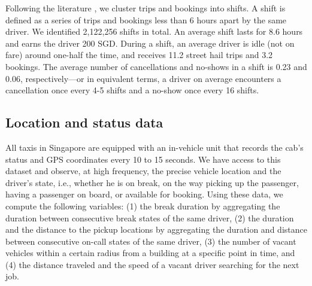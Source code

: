 \documentclass[reviewmode,AEJ]{AEA}
\begin{document}
Following the literature \citep{farber2015you,agarwal2015singaporean}%
, we cluster trips and bookings into shifts. A shift is defined as a series of trips and bookings less than 6 
hours apart by the same driver. %
We identified 2,122,256 shifts in total. An average shift lasts for 8.6 hours and earns the driver 200 SGD. 
During a shift, an average driver is idle (not on fare) around one-half the time, and receives 11.2 street
hail trips and 3.2 bookings. %
The average number of cancellations and no-shows in a shift is 0.23 and 0.06, respectively---or in equivalent terms,
a driver on average encounters a cancellation once every 4-5 shifts and a no-show once every 16 shifts.


\subsection{Location and status data}
All taxis in Singapore are equipped with an in-vehicle unit that records the cab's status and GPS 
coordinates every 10 to 15 seconds. We have access to this dataset and %
observe, at high frequency, the precise vehicle location and the driver's state, i.e., whether he is on break, on the way picking up the passenger, having a passenger on board, or available for booking. Using these data, we compute the following variables: (1) the break duration by aggregating the duration between consecutive break states of the same driver, (2) the duration and  the distance to the pickup locations by aggregating the duration and distance between consecutive on-call states of the same driver, (3) the number of vacant vehicles within a certain radius from a building at a specific point in time, and (4) the distance traveled and the speed of a vacant driver searching for the next job. 
\end{document}
